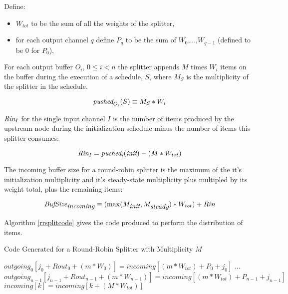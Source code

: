 \documentclass[10pt, letterpaper, onecolumn]{article}
\begin{document}
Define:
\begin{itemize}
\item $W_{tot}$ to be the sum of all the weights of the splitter,
\item for each output channel $q$ define $P_q$ to be the sum of
  $W_0$,...,$W_{q-1}$ (defined to be $0$ for $P_0$), 
\end{itemize}

For each output buffer $O_i$, $0 \le i < n$ the splitter appends $M$ times $W_i$
items on the buffer during the execution of a schedule, $S$, where $M_S$
is the multiplicity of the splitter in the schedule.

\begin{displaymath}
\mbox{\it pushed}_{O_i}(S) \equiv M_S * W_{i}
\end{displaymath}

$\mbox{\it Rin}_I$ for the single input channel $I$ is the number
of items produced by the upstream node during the initialization
schedule minus the number of items this splitter consumes:

\begin{displaymath}
\mbox{\it Rin}_I = \mbox{\it pushed}_i(\mbox{\it init}) - (M * W_{tot})
\end{displaymath}

The incoming buffer size for a round-robin splitter is the maximum of
the it's initialization multiplicity and it's steady-state
multiplicity plus multipled by its weight total, plus the remaining items:

\begin{displaymath}
\mbox{\it BufSize}_{\mbox{\it incoming}} \equiv (\max(M_{\mbox{\it init}}, M_{\mbox{\it steady}}) * W_{tot}) + Rin
\end{displaymath}

Algorithm \ref{rrsplitcode} gives the code produced to perform the distribution
of items.

\begin{algorithm}
\caption{Code Generated for a Round-Robin Splitter with Multiplicity $M$}
\label{rrsplitcode}
\begin{algorithmic}
\STATE ${outgoing}_0[j_0 + {Rout}_0 + (m * W_0)] = {incoming}[(m *
  W_{tot}) + P_0 + j_0]$
\ENDFOR
\STATE ...
\STATE ${outgoing}_{n-1}[j_{n-1} + {Rout}_{n-1} + (m * W_{n-1})] = {incoming}[(m *
  W_{tot}) + P_{n-1} + j_{n-1}]$
\ENDFOR
\ENDFOR
{}
\STATE ${incoming}[k] = {incoming}[k + (M * W_{tot})]$
\ENDFOR 
\end{algorithmic}
\end{algorithm}
\end{document}
